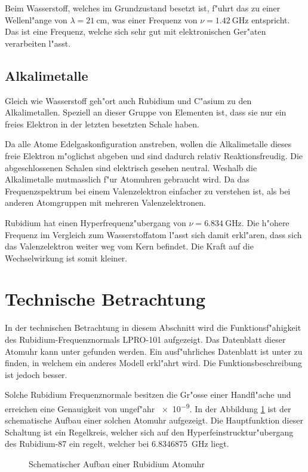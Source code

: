 \begin{refsection}
Beim Wasserstoff, welches im Grundzustand besetzt ist, f"uhrt das zu
einer Wellenl"ange von $\lambda = \SI{21}{\centi\meter}$, was einer
Frequenz von $\nu = \SI{1.42}{\giga\hertz}$ entspricht. Das ist eine
Frequenz, welche sich sehr gut mit elektronischen Ger"aten verarbeiten
l"asst.

\subsection{Alkalimetalle}
Gleich wie Wasserstoff geh"ort auch Rubidium und C"asium zu den
Alkalimetallen. Speziell an dieser Gruppe von Elementen ist, dass sie
nur ein freies Elektron in der letzten besetzten Schale haben.

Da alle Atome Edelgaskonfiguration anstreben, wollen die Alkalimetalle
dieses freie Elektron m"oglichst abgeben und sind dadurch relativ
Reaktionsfreudig.  Die abgeschlossenen Schalen sind elektrisch gesehen
neutral.  Weshalb die Alkalimetalle mutmasslich f"ur Atomuhren
gebraucht wird.  Da das Frequenzspektrum bei einem Valenzelektron
einfacher zu verstehen ist, als bei anderen Atomgruppen mit mehreren
Valenzelektronen.

Rubidium hat einen Hyperfrequenz"ubergang von $\nu =
\SI{6.834}{\giga\hertz}$. Die h"ohere Frequenz im Vergleich zum
Wasserstoffatom l"asst sich damit erkl"aren, dass sich das
Valenzelektron weiter weg vom Kern befindet.  Die Kraft auf die
Wechselwirkung ist somit kleiner.

\section{Technische Betrachtung}
In der technischen Betrachtung in diesem Abschnitt wird die
Funktionsf"ahigkeit des Rubidium-Frequenznormals LPRO-101 aufgezeigt.
Das Datenblatt dieser Atomuhr kann unter \cite{datasheet:lpro}
gefunden werden.  Ein ausf"uhrliches Datenblatt ist unter
\cite{datasheet:prs10m} zu finden, in welchem ein anderes Modell
erkl"ahrt wird.  Die Funktionsbeschreibung ist jedoch besser.

Solche Rubidium Frequenznormale besitzen die Gr"osse einer Handfl"ache
und erreichen eine Genauigkeit von ungef"ahr \num{e-9}.  In der
Abbildung \ref{fig:techBlock} ist der schematische Aufbau einer
solchen Atomuhr aufgezeigt.  Die Hauptfunktion dieser Schaltung ist
ein Regelkreis, welcher sich auf den Hyperfeinstrucktur"ubergang des
Rubidium-87 ein regelt, welcher bei \SI{6.8346875}{\giga\hertz} liegt.

\begin{figure}
  \centering
  
  \caption{Schematischer Aufbau einer Rubidium Atomuhr}
  \label{fig:techBlock}
\end{figure}


\end{refsection}
